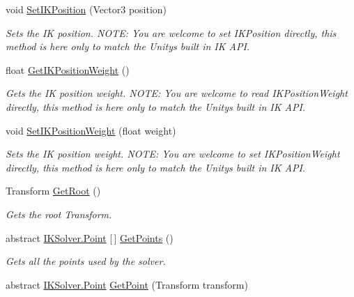 \begin{DoxyCompactItemize}
void \mbox{\hyperlink{class_root_motion_1_1_final_i_k_1_1_i_k_solver_add472956cde95ced7d35975a5a62167b}{Set\+I\+K\+Position}} (Vector3 position)
\begin{DoxyCompactList}\small\item\em Sets the IK position. N\+O\+TE\+: You are welcome to set I\+K\+Position directly, this method is here only to match the Unity\textquotesingle{}s built in IK A\+PI. \end{DoxyCompactList}\item 
float \mbox{\hyperlink{class_root_motion_1_1_final_i_k_1_1_i_k_solver_a1e7f3581aacd744aa9ec017d87f6ad29}{Get\+I\+K\+Position\+Weight}} ()
\begin{DoxyCompactList}\small\item\em Gets the IK position weight. N\+O\+TE\+: You are welcome to read I\+K\+Position\+Weight directly, this method is here only to match the Unity\textquotesingle{}s built in IK A\+PI. \end{DoxyCompactList}\item 
void \mbox{\hyperlink{class_root_motion_1_1_final_i_k_1_1_i_k_solver_aa7a25a1a22a0c48fc276a2c34377c00d}{Set\+I\+K\+Position\+Weight}} (float weight)
\begin{DoxyCompactList}\small\item\em Sets the IK position weight. N\+O\+TE\+: You are welcome to set I\+K\+Position\+Weight directly, this method is here only to match the Unity\textquotesingle{}s built in IK A\+PI. \end{DoxyCompactList}\item 
Transform \mbox{\hyperlink{class_root_motion_1_1_final_i_k_1_1_i_k_solver_ac109094fde448adf73aca8bf1a351b06}{Get\+Root}} ()
\begin{DoxyCompactList}\small\item\em Gets the root Transform. \end{DoxyCompactList}\item 
abstract \mbox{\hyperlink{class_root_motion_1_1_final_i_k_1_1_i_k_solver_1_1_point}{I\+K\+Solver.\+Point}} \mbox{[}$\,$\mbox{]} \mbox{\hyperlink{class_root_motion_1_1_final_i_k_1_1_i_k_solver_a29b0746bebf6bd6645cdeb6617030bff}{Get\+Points}} ()
\begin{DoxyCompactList}\small\item\em Gets all the points used by the solver. \end{DoxyCompactList}\item 
abstract \mbox{\hyperlink{class_root_motion_1_1_final_i_k_1_1_i_k_solver_1_1_point}{I\+K\+Solver.\+Point}} \mbox{\hyperlink{class_root_motion_1_1_final_i_k_1_1_i_k_solver_a8e845886025fb0ca404b85f6747f7281}{Get\+Point}} (Transform transform)

\end{DoxyCompactItemize}

